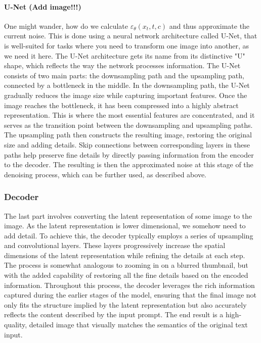 \documentclass[11pt]{article}
\begin{document}
\paragraph{U-Net (Add image!!!)}
One might wander, how do we calculate $\varepsilon_\theta(x_t,t,c)$ and thus approximate the current noise. This is done using a neural network architecture called U-Net\cite{ronneberger2015unetconvolutionalnetworksbiomedical}, that is well-suited for tasks where you need to transform one image into another, as we need it here.
The U-Net architecture gets its name from its distinctive "U" shape, which reflects the way the network processes information. The U-Net consists of two main parts: the downsampling path  and the upsampling path, connected by a bottleneck in the middle.
In the downsampling path, the U-Net gradually reduces the image size while capturing important features. Once the image reaches the bottleneck, it has been compressed into a highly abstract representation. This is where the most essential features are concentrated, and it serves as the transition point between the downsampling and upsampling paths. The upsampling path then constructs the resulting image, restoring the original size and adding details. Skip connections between corresponding layers in these paths help preserve fine details by directly passing information from the encoder to the decoder. 
The resulting is then the approximated noise at this stage of the denoising process, which can be further used, as described above.

\subsubsection{Decoder}
The last part involves converting the latent representation of some image to the image. As the latent representation is lower dimensional, we somehow need to add detail. To achieve this, the decoder typically employs a series of upsampling and convolutional layers. These layers progressively increase the spatial dimensions of the latent representation while refining the details at each step. The process is somewhat analogous to zooming in on a blurred thumbnail, but with the added capability of restoring all the fine details based on the encoded information.
Throughout this process, the decoder leverages the rich information captured during the earlier stages of the model, ensuring that the final image not only fits the structure implied by the latent representation but also accurately reflects the content described by the input prompt. The end result is a high-quality, detailed image that visually matches the semantics of the original text input.
\end{document}

